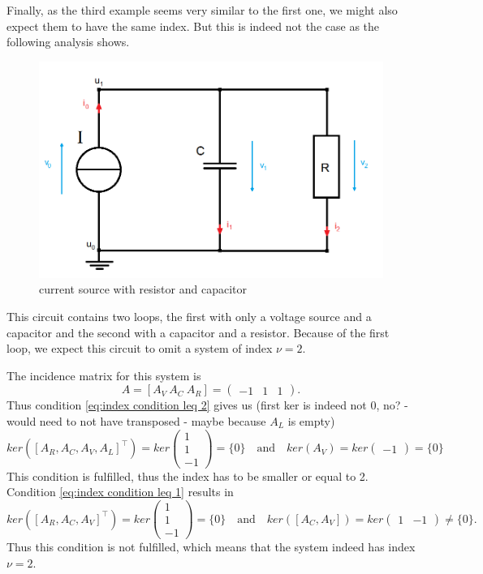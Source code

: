 	Finally, as the third example seems very similar to the first one, we might also expect them to have the same index. But this is indeed not the case as the following analysis shows. 
	\begin{figure}[H]
		\centering
		\includegraphics[scale = 0.4]{pictures/Example3.png}
		\caption{current source with resistor and capacitor} 
	\end{figure}
	This circuit contains two loops, the first with only a voltage source and a capacitor and the second with a capacitor and a resistor. Because of the first loop, we expect this circuit to omit a system of index $\nu = 2$.
	
	The incidence matrix for this system is
	\begin{displaymath}
		A = [A_V~A_C~A_R] = 
		\left(
		\begin{matrix}
			-1 & 1 & 1
		\end{matrix}
		\right).
	\end{displaymath} 
	Thus condition \eqref{eq:index condition leq 2} gives us (first ker is indeed not 0, no? - would need to not have transposed - maybe because $A_L$ is empty)
	\begin{displaymath}
		ker([A_R, A_C, A_V, A_L]^\top) = ker
		\left(
		\begin{matrix}
			1 \\
			1 \\ 
			-1
		\end{matrix}
		\right) = \{0\}
		\quad \text{and} \quad 
		ker(A_V) = ker
		\left(
		\begin{matrix}
			-1
		\end{matrix}
		\right) = \{0\}
	\end{displaymath}
	This condition is fulfilled, thus the index has to be smaller or equal to 2.
	Condition \eqref{eq:index condition leq 1} results in
	\begin{displaymath}
		ker([A_R, A_C, A_V]^\top) = ker\left(
		\begin{matrix}
			1 \\
			1 \\
			-1
		\end{matrix}
		\right) = \{0\}
		\quad \text{and} \quad
		ker([A_C, A_V]) = ker
		\left(
		\begin{matrix}
			1 & -1
		\end{matrix}
		\right) \neq \{0\}.
	\end{displaymath}
	Thus this condition is not fulfilled, which means that the system indeed has index $\nu = 2$.
